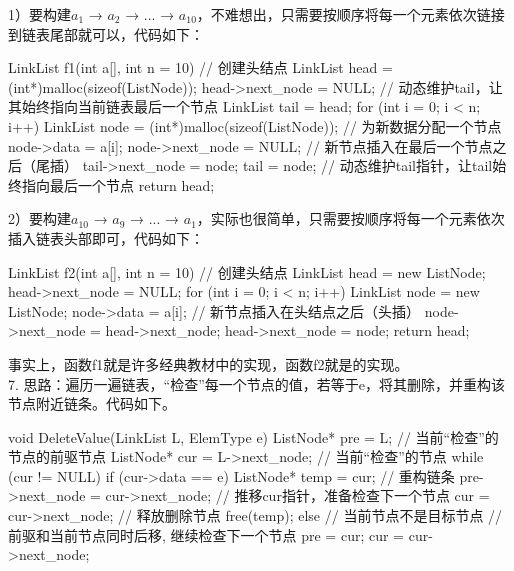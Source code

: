 1）要构建\(a_1\) → \(a_2\) → ... → \(a_{10}\)，不难想出，只需要按顺序将每一个元素依次链接到链表尾部就可以，代码如下：
\begin{cppcode}
    LinkList f1(int a[], int n = 10) {
        // 创建头结点
        LinkList head = (int*)malloc(sizeof(ListNode));
        head->next_node = NULL;
        // 动态维护tail，让其始终指向当前链表最后一个节点
        LinkList tail = head;
        for (int i = 0; i < n; i++) {
            LinkList node = (int*)malloc(sizeof(ListNode));   // 为新数据分配一个节点
            node->data = a[i];
            node->next_node = NULL;
            // 新节点插入在最后一个节点之后（尾插）
            tail->next_node = node;
            tail = node;    // 动态维护tail指针，让tail始终指向最后一个节点
        }
        return head;
    }
\end{cppcode}

    2）要构建\(a_{10}\) → \(a_9\) → ... → \(a_1\)，实际也很简单，只需要按顺序将每一个元素依次插入链表头部即可，代码如下：
    \begin{cppcode}
        LinkList f2(int a[], int n = 10) {
            // 创建头结点
            LinkList head = new ListNode;
            head->next_node = NULL;
            for (int i = 0; i < n; i++) {
                LinkList node = new ListNode;
                node->data = a[i];
                // 新节点插入在头结点之后（头插）
                node->next_node = head->next_node;
                head->next_node = node;
            }
            return head;
        }
    \end{cppcode}
    事实上，函数f1就是许多经典教材中的实现，函数f2就是的实现。\\


7. 思路：遍历一遍链表，“检查”每一个节点的值，若等于e，将其删除，并重构该节点附近链条。代码如下。
\begin{cppcode}
    void DeleteValue(LinkList L, ElemType e) {
        ListNode* pre = L;          // 当前“检查”的节点的前驱节点
        ListNode* cur = L->next_node; // 当前“检查”的节点
        while (cur != NULL) {
            if (cur->data == e) {
                ListNode* temp = cur;
                // 重构链条
                pre->next_node = cur->next_node;
                // 推移cur指针，准备检查下一个节点
                cur = cur->next_node;
                // 释放删除节点
                free(temp);
            }
            else {
                // 当前节点不是目标节点
                // 前驱和当前节点同时后移, 继续检查下一个节点
                pre = cur;
                cur = cur->next_node;
            }
        }
    }
\end{cppcode}

